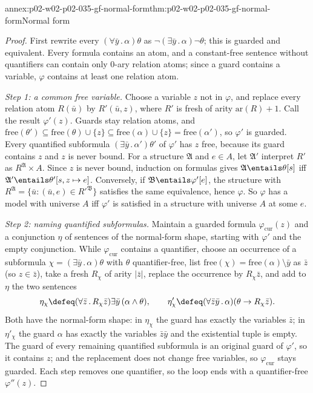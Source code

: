 \begin{annexitem}{annex:p02-w02-p02-035-gf-normal-form}{thm:p02-w02-p02-035-gf-normal-form}{Normal form}
\begin{proof}
First rewrite every \((\forall\bar y\,.\,\alpha)\theta\) as
\(\neg(\exists\bar y\,.\,\alpha)\neg\theta\); this is guarded and equivalent.
Every formula contains an atom, and a constant-free sentence without
quantifiers can contain only \(0\)-ary relation atoms; since a guard
contains a variable, \(\varphi\) contains at least one relation atom.

\emph{Step 1: a common free variable.}  Choose a variable \(z\) not in
\(\varphi\), and replace every relation atom \(R(\bar u)\) by
\(R'(\bar u,z)\), where \(R'\) is fresh of arity \(\mathrm{ar}(R)+1\).  Call
the result \(\varphi'(z)\).  Guards stay relation atoms, and
\(\mathrm{free}(\theta')\subseteq\mathrm{free}(\theta)\cup\{z\}\subseteq
\mathrm{free}(\alpha)\cup\{z\}=\mathrm{free}(\alpha')\), so \(\varphi'\) is
guarded.  Every quantified subformula \((\exists\bar y\,.\,\alpha')\theta'\)
of \(\varphi'\) has \(z\) free, because its guard contains \(z\) and \(z\) is
never bound.  For a structure \(\mathfrak A\) and \(e\in A\), let
\(\mathfrak A'\) interpret \(R'\) as \(R^{\mathfrak A}\times A\).  Since
\(z\) is never bound, induction on formulas gives
\(\mathfrak A\entails\theta[s]\) iff \(\mathfrak A'\entails\theta'[s,z\mapsto e]\).
Conversely, if \(\mathfrak B\entails\varphi'[e]\), the structure with
\(R^{\mathfrak A}=\{\bar u:(\bar u,e)\in R'^{\mathfrak B}\}\) satisfies the
same equivalence, hence \(\varphi\).  So \(\varphi\) has a model with
universe \(A\) iff \(\varphi'\) is satisfied in a structure with universe
\(A\) at some \(e\).

\emph{Step 2: naming quantified subformulas.}  Maintain a guarded formula
\(\varphi_{\mathrm{cur}}(z)\) and a conjunction \(\eta\) of sentences of the
normal-form shape, starting with \(\varphi'\) and the empty conjunction.
While \(\varphi_{\mathrm{cur}}\) contains a quantifier, choose an occurrence
of a subformula \(\chi=(\exists\bar y\,.\,\alpha)\theta\) with \(\theta\)
quantifier-free, list \(\mathrm{free}(\chi)=\mathrm{free}(\alpha)\setminus\bar y\)
as \(\bar z\) (so \(z\in\bar z\)), take a fresh \(R_\chi\) of arity
\(\lvert\bar z\rvert\), replace the occurrence by \(R_\chi\bar z\), and add to
\(\eta\) the two sentences
\[
 \eta_\chi\defeq(\forall\bar z\,.\,R_\chi\bar z)\exists\bar y\,(\alpha\land\theta),
 \qquad
 \eta'_\chi\defeq(\forall\bar z\bar y\,.\,\alpha)(\theta\to R_\chi\bar z).
\]
Both have the normal-form shape: in \(\eta_\chi\) the guard has exactly the
variables \(\bar z\); in \(\eta'_\chi\) the guard \(\alpha\) has exactly the
variables \(\bar z\bar y\) and the existential tuple is empty.  The guard of
every remaining quantified subformula is an original guard of
\(\varphi'\), so it contains \(z\); and the replacement does not change free
variables, so \(\varphi_{\mathrm{cur}}\) stays guarded.  Each step removes
one quantifier, so the loop ends with a quantifier-free \(\varphi''(z)\).


\end{proof}
\end{annexitem}
